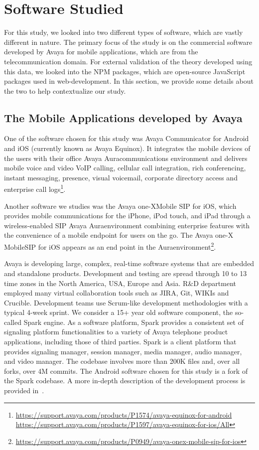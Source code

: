 \documentclass[smallextended]{svjour3}       %
\begin{document}
\section{Software Studied}\label{s:soft}

For this study, we looked into two different types of software, which are vastly different in nature. The primary focus of the study is on the commercial software developed by Avaya for mobile applications, which are from the telecommunication domain. For external validation of the theory developed using this data, we looked into the NPM packages, which are open-source JavaScript packages used in web-development. In this section, we provide some details about the two to help contextualize our study.

\subsection{The Mobile Applications developed by Avaya}
One of the software chosen for this study was Avaya Communicator for
Android and iOS (currently known as Avaya Equinox\textregistered ). It
integrates the mobile devices of the users with their office Avaya
Aura\textregistered communications environment and delivers mobile
voice and video VoIP calling, cellular call integration, rich
conferencing, instant messaging, presence, visual voicemail,
corporate directory access and enterprise call logs\footnote{\url{https://support.avaya.com/products/P1574/avaya-equinox-for-android}\\   \url{https://support.avaya.com/products/P1597/avaya-equinox-for-ios/All}}.

Another software we studies was the Avaya one-X\textregistered Mobile  SIP  for  iOS, which provides mobile communications for the iPhone, iPod touch, and iPad through a wireless-enabled SIP Avaya Aura\textregistered environment combining enterprise features with the convenience of a mobile endpoint for users on the go. The Avaya one-X Mobile\textregistered SIP for iOS appears as an end point in the Aura\textregistered environment\footnote{\url{https://support.avaya.com/products/P0949/avaya-onex-mobile-sip-for-ios}}.

Avaya is developing large, complex, real-time software systems that
are embedded and standalone products. Development and testing are
spread through 10 to 13 time zones in the North America, USA, Europe
and Asia. R\&D department employed many virtual collaboration tools
such as JIRA, Git, WIKIs and Crucible. Development teams use
Scrum-like development methodologies with a typical 4-week
sprint. We consider a 15+ year old software component, the so-called
Spark engine.  As a software platform, Spark provides a consistent
set of signaling platform functionalities to a variety of Avaya
telephone product applications, including those of third parties.
Spark is a client platform that provides signaling manager, session
manager, media manager, audio manager, and video manager. The
codebase involves more than 200K files and, over all forks, over 4M
commits.  The Android software chosen for this study is a fork of
the Spark codebase. A more in-depth description of the development
process is provided in~\cite{amhp14}.
\end{document}

